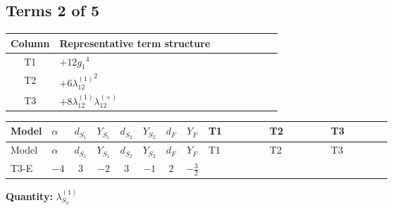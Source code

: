 \documentclass[8pt]{article}
\begin{document}
\begin{landscape}
\subsection*{Terms 2 of 5}
\begin{center}
\begin{tabular}{@{}c >{\raggedright\arraybackslash}p{0.82\linewidth}@{}}
\toprule
Column & Representative term structure \\
\midrule
T1 & \(\displaystyle +12 {g_1}^4\) \\
\midrule
T2 & \(\displaystyle +6 {\lambda_{12}^{(1)}}^2\) \\
\midrule
T3 & \(\displaystyle +8 {\lambda_{12}^{(1)}} {\lambda_{12}^{(\times)}}\) \\
\midrule
\bottomrule
\end{tabular}
\end{center}
\smallskip
\tiny
\begin{longtable}{@{}llcccccc >{\raggedright\arraybackslash}p{0.21\linewidth} >{\raggedright\arraybackslash}p{0.21\linewidth} >{\raggedright\arraybackslash}p{0.21\linewidth}@{}}
\toprule
Model & $\alpha$ & $d_{S_1}$ & $Y_{S_1}$ & $d_{S_2}$ & $Y_{S_2}$ & $d_F$ & $Y_F$ & T1 & T2 & T3 \\
\midrule
\endfirsthead
\toprule
Model & $\alpha$ & $d_{S_1}$ & $Y_{S_1}$ & $d_{S_2}$ & $Y_{S_2}$ & $d_F$ & $Y_F$ & T1 & T2 & T3 \\
\midrule
\endhead
T3-E & $-4$ & $3$ & $-2$ & $3$ & $-1$ & $2$ & $-\frac{3}{2}$ & \scriptsize\adjustbox{max width=\linewidth}{$\begin{gathered} +12 {g_1}^4\end{gathered}$} & \scriptsize\adjustbox{max width=\linewidth}{$\begin{gathered} +6 {\lambda_{12}^{(1)}}^2\end{gathered}$} & \scriptsize\adjustbox{max width=\linewidth}{$\begin{gathered} +8 {\lambda_{12}^{(1)}} {\lambda_{12}^{(\times)}}\end{gathered}$} \\
\midrule
\bottomrule
\end{longtable}
\clearpage
\noindent\textbf{Quantity: }$\lambda_{S_2}^{(1)}$\par\smallskip

\end{landscape}
\end{document}
